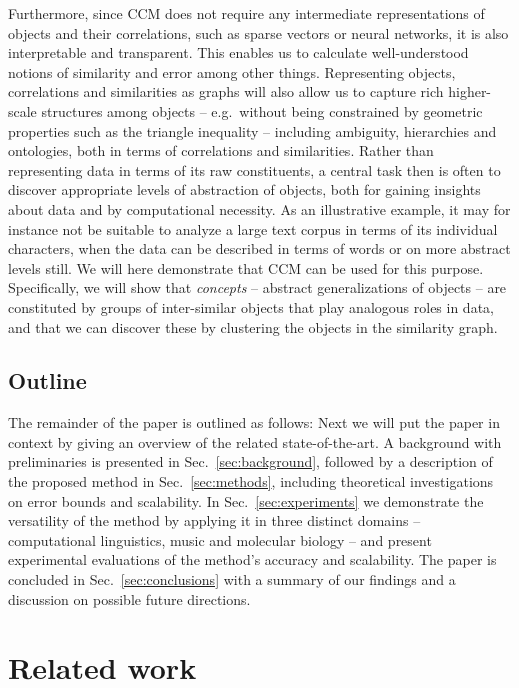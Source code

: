 \documentclass{kais}
\begin{document}
Furthermore, since CCM does not require any intermediate representations of objects and their correlations, such as sparse vectors
 or neural networks, it is also interpretable and transparent. This enables us to calculate well-understood notions
of similarity and error among other things. Representing objects, correlations and similarities as graphs will also allow us
 to capture rich higher-scale structures among objects -- e.g.\ without being constrained by geometric properties such as the triangle 
inequality -- including ambiguity, hierarchies and ontologies, both in terms of correlations and similarities.
Rather than representing data in terms of its raw constituents, a central task then is often to discover appropriate levels of abstraction 
of objects, both for gaining insights about data and by computational necessity. As an illustrative example, it may 
for instance not be suitable to analyze a large text corpus in terms of its individual characters, when the data can be described in 
terms of words or on more abstract levels still. We will here demonstrate that CCM can be used for this purpose. Specifically, we will show 
that \emph{concepts} -- abstract generalizations of objects -- are constituted by groups of inter-similar objects that play 
analogous roles in data, and that we can discover these by clustering the objects in the similarity graph. 

\subsection{Outline}
The remainder of the paper is outlined as follows: Next we will put the paper in context by giving an overview of the related
state-of-the-art. A background with preliminaries is presented in Sec.\ \ref{sec:background}, followed by a description of the
proposed method in Sec.\ \ref{sec:methods}, including theoretical investigations on error bounds and scalability. 
In Sec.\ \ref{sec:experiments} we demonstrate the versatility of the method by
applying it in three distinct domains -- computational linguistics, music and molecular biology -- and present experimental evaluations
of the method's accuracy and scalability. The paper is concluded in Sec.\ \ref{sec:conclusions} with a summary of our findings 
and a discussion on possible future directions.

\section{Related work}
\label{sec:related work}
\end{document}
